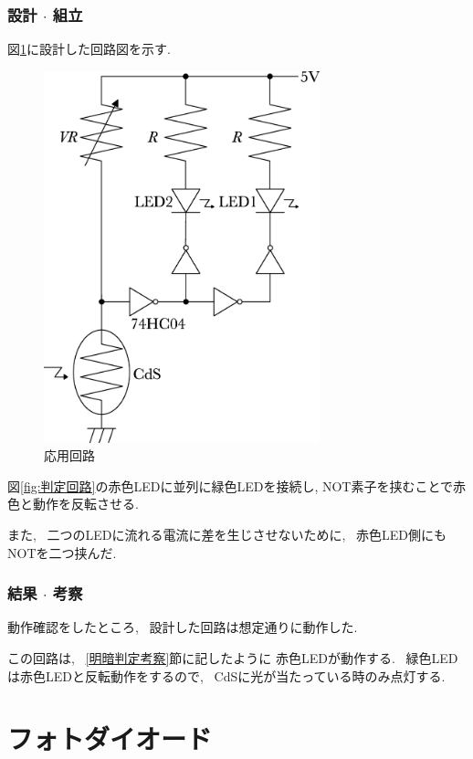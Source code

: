 \documentclass[titlepage]{jsarticle}
\begin{document}
        \subsubsection{設計 $\cdot$ 組立}
            図\ref{fig:応用回路}に設計した回路図を示す.
            
            \begin{figure}[ht]
                \centering
                \includegraphics[width=8cm]{images/ouyoukairo.eps}
                \caption{応用回路}
                \label{fig:応用回路}
            \end{figure}

            図\ref{fig:判定回路}の赤色LEDに並列に緑色LEDを接続し,
            NOT素子を挟むことで赤色と動作を反転させる.

            また, ~二つのLEDに流れる電流に差を生じさせないために,
            ~赤色LED側にもNOTを二つ挟んだ.
        
        \subsubsection{結果 $\cdot$ 考察}
            動作確認をしたところ, ~設計した回路は想定通りに動作した.
            
            この回路は, ~\ref{明暗判定考察}節に記したように
            赤色LEDが動作する. ~緑色LEDは赤色LEDと反転動作をするので,
            ~CdSに光が当たっている時のみ点灯する.

\section{フォトダイオード}
\end{document}
